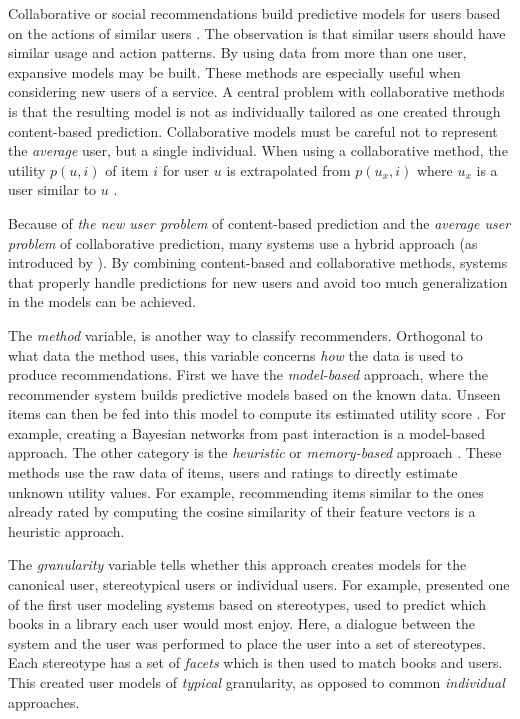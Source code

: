 Collaborative or social recommendations build predictive models for users based on the actions of similar users 
\citep{Schafer2007}.
The observation is that similar users should have similar usage and action patterns. 
By using data from more than one user, expansive models may be built. 
These methods are especially useful when considering new users of a service. 
A central problem with collaborative methods is that the resulting model is not as individually tailored as one created through content-based prediction. 
Collaborative models must be careful not to represent the \emph{average} user, but a single individual.
When using a collaborative method, 
the utility $p(u,i)$ of item $i$ for user $u$ is extrapolated from $p(u_x,i)$ where $u_x$ is a user similar to $u$
\cite[p4]{Adomavicius2005}. 

Because of \emph{the new user problem} of content-based prediction and the \emph{average user problem} of collaborative prediction, 
many systems use a hybrid approach (as introduced by \cite{Burke2007}).
By combining content-based and collaborative methods, 
systems that properly handle predictions for new users and avoid too much generalization in the models can be achieved. 

The \emph{method} variable, is another way to classify recommenders. Orthogonal to what data the method uses, this variable
concerns \emph{how} the data is used to produce recommendations.
First we have the \emph{model-based} approach, where the recommender system builds predictive models based on the known data. 
Unseen items can then be fed into this model to compute its estimated utility score
\cite[p5]{Adomavicius2005}. 
For example, creating a Bayesian networks from past interaction is a model-based approach.
The other category is the \emph{heuristic} or \emph{memory-based} approach \cite[p5]{Adomavicius2005}. 
These methods use the raw data of items, users and ratings to directly estimate unknown utility values. 
For example, recommending items similar to the ones already rated by computing the cosine similarity of their feature vectors is a heuristic approach.

The \emph{granularity} variable tells whether this approach creates models for the canonical user, stereotypical users or individual users. 
For example, \cite{Rich1979} presented one of the first user modeling systems based on stereotypes, 
used to predict which books in a library each user would most enjoy.
Here, a dialogue between the system and the user was performed to place the user into a set of stereotypes. 
Each stereotype has a set of \emph{facets} which is then used to match books and users.
This created user models of \emph{typical} granularity, as opposed to common \emph{individual} approaches.

